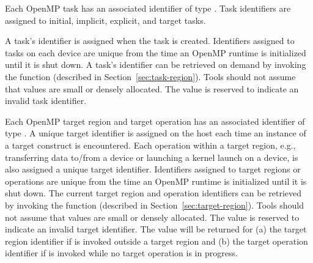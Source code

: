  
Each OpenMP task has an associated identifier of type
. Task identifiers are assigned to
initial, implicit, explicit, and target tasks.
\begin{comment}
\begin{boxedcode}
typedef uint64\_t ompt\_task\_id\_t;
\end{boxedcode}
\end{comment} 
  A task's identifier is assigned
  when the task is created. 
  Identifiers assigned to tasks on each device are unique from the time an 
  OpenMP runtime is initialized until it is shut down. 
  A task's identifier can be retrieved
  on demand by invoking the   function (described in Section~\ref{sec:task-region}).
  Tools should not assume that  values are small or densely allocated. 
  The value  is reserved to indicate an invalid task identifier.
  
Each OpenMP target region and target operation has an associated identifier of type . 
A unique target identifier is assigned on the host each time an instance of a target construct is encountered.
Each operation within a target region, e.g., transferring data to/from a device or launching a kernel launch 
on a device, is also assigned a unique target identifier. 
Identifiers assigned to target regions or operations 
are unique from the time an OpenMP runtime is initialized until it is shut down. 
The current target region and operation identifiers can be retrieved by invoking the  function (described in Section~\ref{sec:target-region}).
Tools should not assume that  values are small or densely allocated. 
The value  is reserved to indicate an invalid target identifier. 
The value  will be returned for (a) the target region identifier if  is invoked outside a target region and (b) the target operation identifier if  is invoked while no target operation is in progress.


